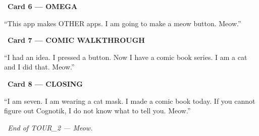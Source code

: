 \documentclass[12pt, letterpaper]{article}
\begin{document}
  \begin{cuecard}
    \begin{center}
      {\Large {}\ \textbf{\color{catpink}Card 6 — OMEGA}}
    \end{center}
    \medskip
    {\large
    ``This app makes OTHER apps. I am going to make a meow button.
    Meow.''}
  \end{cuecard}

  \begin{cuecard}
    \begin{center}
      {\Large {}\ \textbf{\color{catpink}Card 7 — COMIC WALKTHROUGH}}
    \end{center}
    \medskip
    {\large
    ``I had an idea. I pressed a button. Now I have a comic book series.
    I am a cat and I did that. Meow.''}
  \end{cuecard}

  \begin{cuecard}
    \begin{center}
      {\Large {}\ \textbf{\color{catpink}Card 8 — CLOSING}}
    \end{center}
    \medskip
    {\large
    ``I am seven. I am wearing a cat mask. I made a comic book today.
    If you cannot figure out Cognotik, I do not know what to tell you. Meow.''}
  \end{cuecard}

  \vfill

  \begin{center}
    \textit{\color{catpink}\Large{}\ End of TOUR\_2 — Meow.\ }
  \end{center}

  
\end{document}
